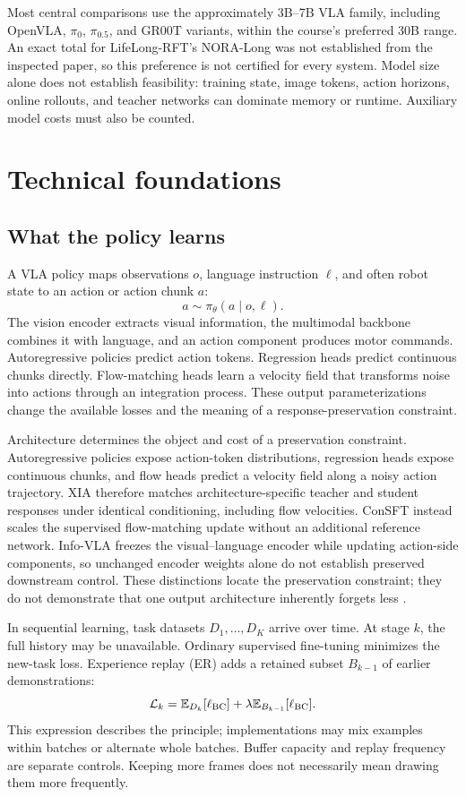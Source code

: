 \documentclass[11pt,a4paper]{article}
\begin{document}
Most central comparisons use the approximately 3B--7B VLA family, including OpenVLA, $\pi_0$, $\pi_{0.5}$, and GR00T variants, within the course's preferred 30B range. An exact total for LifeLong-RFT's NORA-Long was not established from the inspected paper, so this preference is not certified for every system. Model size alone does not establish feasibility: training state, image tokens, action horizons, online rollouts, and teacher networks can dominate memory or runtime. Auxiliary model costs must also be counted.

\section{Technical foundations}
\subsection{What the policy learns}
A VLA policy maps observations $o$, language instruction $\ell$, and often robot state to an action or action chunk $a$:
\begin{equation}
 a\sim\pi_\theta(a\mid o,\ell).
\end{equation}
The vision encoder extracts visual information, the multimodal backbone combines it with language, and an action component produces motor commands. Autoregressive policies predict action tokens. Regression heads predict continuous chunks directly. Flow-matching heads learn a velocity field that transforms noise into actions through an integration process. These output parameterizations change the available losses and the meaning of a response-preservation constraint.

Architecture determines the object and cost of a preservation constraint. Autoregressive policies expose action-token distributions, regression heads expose continuous chunks, and flow heads predict a velocity field along a noisy action trajectory. XIA therefore matches architecture-specific teacher and student responses under identical conditioning, including flow velocities. ConSFT instead scales the supervised flow-matching update without an additional reference network. Info-VLA freezes the visual--language encoder while updating action-side components, so unchanged encoder weights alone do not establish preserved downstream control. These distinctions locate the preservation constraint; they do not demonstrate that one output architecture inherently forgets less \cite{xia,consft,info}.

In sequential learning, task datasets $D_1,\ldots,D_K$ arrive over time. At stage $k$, the full history may be unavailable. Ordinary supervised fine-tuning minimizes the new-task loss. Experience replay (ER) adds a retained subset $B_{k-1}$ of earlier demonstrations:
\begin{equation}
\mathcal L_k=\mathbb E_{D_k}[\ell_{\rm BC}]+\lambda\mathbb E_{B_{k-1}}[\ell_{\rm BC}].
\label{eq:er}
\end{equation}
This expression describes the principle; implementations may mix examples within batches or alternate whole batches. Buffer capacity and replay frequency are separate controls. Keeping more frames does not necessarily mean drawing them more frequently.
\end{document}
